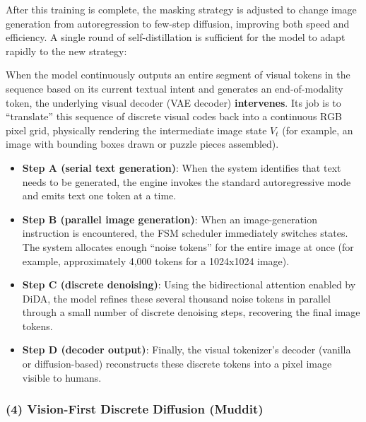 After this training is complete, the masking strategy is adjusted to change image generation from autoregression to few-step diffusion, improving both speed and efficiency. A single round of self-distillation is sufficient for the model to adapt rapidly to the new strategy:

When the model continuously outputs an entire segment of visual tokens in the sequence based on its current textual intent and generates an end-of-modality token, the underlying visual decoder (VAE decoder) \textbf{intervenes}. Its job is to ``translate'' this sequence of discrete visual codes back into a continuous RGB pixel grid, physically rendering the intermediate image state \(V_t\) (for example, an image with bounding boxes drawn or puzzle pieces assembled).

\begin{itemize}
\tightlist
\item
  \textbf{Step A (serial text generation)}: When the system identifies that text needs to be generated, the engine invokes the standard autoregressive mode and emits text one token at a time.
\item
  \textbf{Step B (parallel image generation)}: When an image-generation instruction is encountered, the FSM scheduler immediately switches states. The system allocates enough ``noise tokens'' for the entire image at once (for example, approximately 4,000 tokens for a 1024x1024 image).
\item
  \textbf{Step C (discrete denoising)}: Using the bidirectional attention enabled by DiDA, the model refines these several thousand noise tokens in parallel through a small number of discrete denoising steps, recovering the final image tokens.
\item
  \textbf{Step D (decoder output)}: Finally, the visual tokenizer's decoder (vanilla or diffusion-based) reconstructs these discrete tokens into a pixel image visible to humans.
\end{itemize}

\hypertarget{vision-first-discrete-diffusion-muddit}{%
\subsubsection{(4) Vision-First Discrete Diffusion (Muddit)}\label{vision-first-discrete-diffusion-muddit}}


